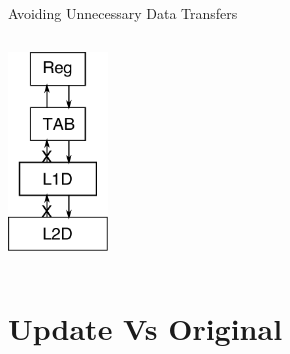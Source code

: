 \documentclass{beamer}
\begin{document}
\begin{frame}{Avoiding Unnecessary Data Transfers}
\begin{columns}
      \includegraphics[width=0.33\textwidth]{figures/memorytransfer_writecontiguous.pdf}
   \end{columns}
\end{frame}
\section{Update Vs Original}
\end{document}
